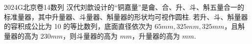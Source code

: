 
\begin{problem}{2024}{G}{北京卷}{14}{数列}
汉代刘歆设计的“铜嘉量”是龠、合、升、斗、斛五量合一的标准量器，其中升量器、斗量器、斛量器的形状均可视作圆柱. 若升、斗、斛量器的容积成公比为 10 的等比数列，底面直径依次为 $65mm, 325mm, 325mm$，且斛量器的高为 $230mm$，则斗量器的高为\underline{\hspace{4em}} $mm$，升量器的高为\underline{\hspace{4em}} $mm$.
\end{problem}